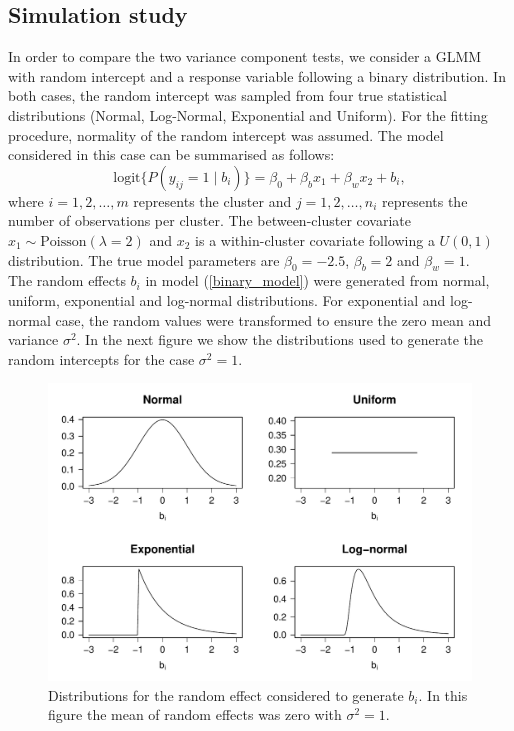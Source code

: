 \documentclass{sciposter}
\begin{document}
\begin{boldmath}
\begin{multicols}{3}
\section{Simulation study}

In order to compare the two variance component tests, we consider a GLMM with random intercept and a response variable following a binary distribution. In both cases, the random intercept was sampled from four true statistical distributions (Normal, Log-Normal, Exponential and Uniform). For the fitting procedure, normality of the random intercept was assumed. The model considered in this case can be summarised as follows:
\begin{equation} \label{binary_model}
\text{logit} \{ P(y_{ij} = 1 \mid b_i) \} = \beta_0 + \beta_{b} x_1 + \beta_{w} x_2 + b_i,
\end{equation}
where $i=1,2,\ldots,m$ represents the cluster and $j=1,2,\ldots,n_i$ represents the number of observations per cluster. The between-cluster covariate $x_1 \sim \text{Poisson}(\lambda=2)$ and $x_2$ is a within-cluster covariate following a $U(0, 1)$ distribution. The true model parameters are $\beta_0=-2.5$, $\beta_{b}=2$ and $\beta_{w}=1$.\\

The random effects $b_i$ in model (\ref{binary_model}) were generated from normal, uniform, exponential and log-normal distributions. For exponential and log-normal case, the random values were transformed to ensure the zero mean and variance $\sigma^2$. In the next figure we show the distributions used to generate the random intercepts for the case $\sigma^2=1$.

\begin{figure}[h]\centering
\includegraphics[scale=1.05]{REdist.pdf}
\caption{\label{REdist} Distributions for the random effect considered to generate $b_i$. In this figure the mean of random effects was zero with $\sigma^2=1$.}
\end{figure}

\end{multicols}
\end{boldmath}
\end{document}
